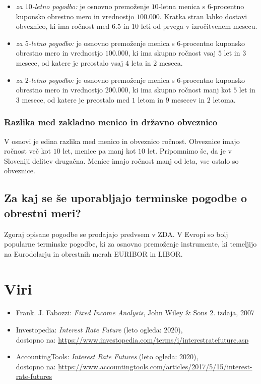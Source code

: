 \documentclass[a4paper, 11pt]{article}
\begin{document}
\begin{itemize}
    \item \textit{za $10$-letno pogodbo:} je osnovno premoženje $10$-letna menica s $6$-procentno
            kuponsko obrestno mero in vrednostjo \textdollar$100.000$. Kratka stran lahko dostavi 
            obveznico, ki ima ročnost med $6.5$ in $10$ leti od prvega v izročitvenem mesecu.
    \item \textit{za $5$-letno pogodbo:} je osnovno premoženje menica s $6$-procentno kuponsko 
            obrestno mero in vrednostjo \textdollar$100.000$, ki ima skupno ročnost vsaj $5$ let
            in $3$ mesece, od katere je preostalo vsaj $4$ leta in $2$ meseca.
    \item \textit{za $2$-letno pogodbo:} je osnovno premoženje menica s $6$-procentno kuponsko 
    obrestno mero in vrednostjo \textdollar$200.000$, ki ima skupno ročnost manj kot $5$ let
    in $3$ mesece, od katere je preostalo med $1$ letom in $9$ mesecev in $2$ letoma.
\end{itemize} 

\subsubsection{Razlika med zakladno menico in državno obveznico}
V osnovi je edina razlika med menico in obveznico ročnost. Obveznice imajo ročnost več kot $10$
let, menice pa manj kot $10$ let. Pripomnimo še, da je v Sloveniji delitev drugačna. Menice imajo
ročnost manj od leta, vse ostalo so obveznice.

\subsection{Za kaj se še uporabljajo terminske pogodbe o obrestni meri?}
Zgoraj opisane pogodbe se prodajajo predvsem v ZDA. V Evropi so bolj popularne terminske pogodbe, ki 
za osnovno premoženje instrumente, ki temeljijo na Eurodolarju in obrestnih merah EURIBOR in LIBOR.

\section{Viri}
\begin{itemize}
    \item Frank. J. Fabozzi: \textit{Fixed Income Analysis}, John Wiley \& Sons $2$. izdaja, 2007
    \item Investopedia: \textit{Interest Rate Future} (leto ogleda: $2020$), \\
            dostopno na: \url{https://www.investopedia.com/terms/i/interestratefuture.asp}
            \item AccountingTools: \textit{Interest Rate Futures} (leto ogleda: $2020$), \\
            dostopno na: \url{https://www.accountingtools.com/articles/2017/5/15/interest-rate-futures}
\end{itemize}
\end{document}
